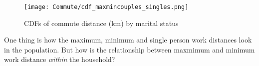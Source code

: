 \begin{figure}[!htb]
\centering
\begin{minipage}{0.8\textwidth}
\texttt{[image: Commute/cdf\_maxmincouples\_singles.png]} 
\end{minipage}
\caption{CDFs of commute distance (km) by marital status}
\label{fig:cdfcom}
\end{figure}

One thing is how the maximum, minimum and single person work distances look in the population. But how is the relationship between maxmimum and minimum work distance \textit{within} the household? 

